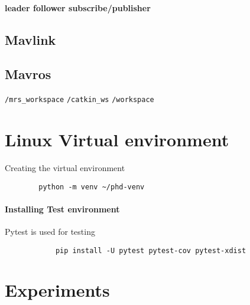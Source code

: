         \paragraph{leader follower subscribe/publisher}
    
    \subsection{Mavlink}
    \subsection{Mavros}
        \texttt{/mrs\_workspace}
        \texttt{/catkin\_ws}
        \texttt{/workspace}

\section{Linux Virtual environment}
    Creating the virtual environment
    \begin{verbatim}
        python -m venv ~/phd-venv
    \end{verbatim}
    \paragraph{Installing Test environment}
        Pytest is used for testing
        \begin{verbatim}
            pip install -U pytest pytest-cov pytest-xdist
        \end{verbatim}

\section{Experiments}
